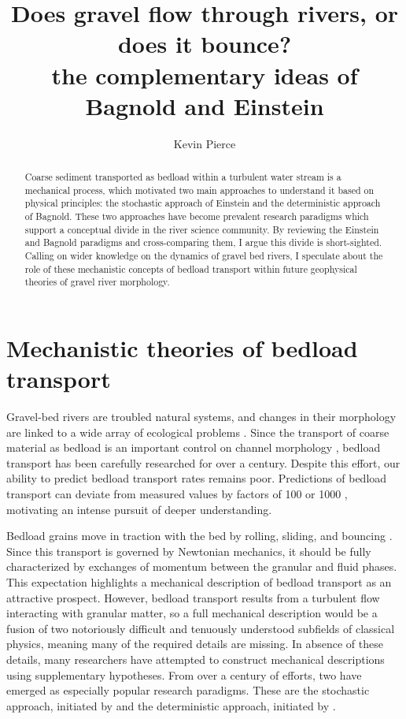 \documentclass{article}
\begin{document}
\title{Does gravel flow through rivers, or does it bounce?\\ the complementary ideas of Bagnold and Einstein}
\author{Kevin Pierce}
\maketitle

\begin{abstract}
\noindent Coarse sediment transported as bedload within a turbulent water stream is a mechanical process, which motivated two main approaches to understand it based on physical principles: the stochastic approach of Einstein and the deterministic approach of Bagnold. 
These two approaches have become prevalent research paradigms which support a conceptual divide in the river science community. 
By reviewing the Einstein and Bagnold paradigms and cross-comparing them, I argue this divide is short-sighted. 
Calling on wider knowledge on the dynamics of gravel bed rivers, I speculate about the role of these mechanistic concepts of bedload transport within future geophysical theories of gravel river morphology.  
\end{abstract}


\section{Mechanistic theories of bedload transport}


Gravel-bed rivers are troubled natural systems, and changes in their morphology are linked to a wide array of ecological problems \citep{Newson2000, Gaeuman2017}.  
Since the transport of coarse material as bedload is an important control on channel morphology \citep{Church2006, Recking2016}, bedload transport has been carefully researched for over a century. 
Despite this effort, our ability to predict bedload transport rates remains poor.
Predictions of bedload transport can deviate from measured values by factors of 100 or 1000 \citep{Gomez1989, Barry2004, Recking2012}, motivating an intense pursuit of deeper understanding. 
 
Bedload grains move in traction with the bed by rolling, sliding, and bouncing \citep{Einstein1950, Bagnold1973}. 
Since this transport is governed by Newtonian mechanics, it should be fully characterized by exchanges of momentum between the granular and fluid phases.
This expectation highlights a mechanical description of bedload transport as an attractive prospect.
However, bedload transport results from a turbulent flow interacting with granular matter, so a full mechanical description would be a fusion of two notoriously difficult and tenuously understood subfields of classical physics, meaning many of the required details are missing.
In absence of these details, many researchers have attempted to construct mechanical descriptions using supplementary hypotheses. 
From over a century of efforts, two have emerged as especially popular research paradigms. 
These are the stochastic approach, initiated by \citet{Einstein1937, Einstein1950, Einstein1964} and the deterministic approach, initiated by \citet{Bagnold1956, Bagnold1966, Bagnold1973}. 
\end{document}
